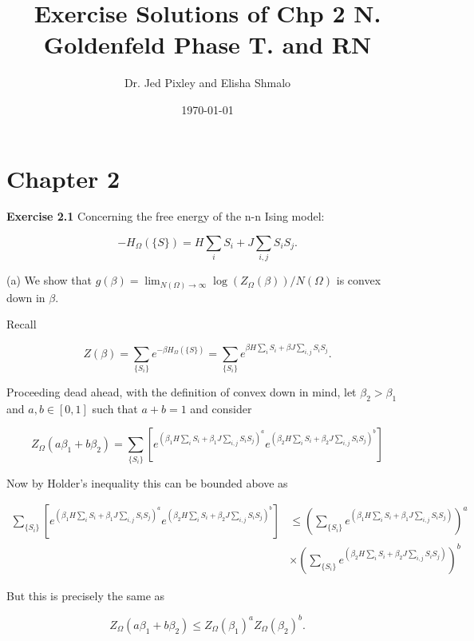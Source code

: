 \documentclass[12pt]{article}
\title{\textbf{Exercise Solutions of Chp 2 N. Goldenfeld Phase T. and RN}}
\author{Dr. Jed Pixley and Elisha Shmalo}
\date{\today}
\numberwithin{equation}{section}
\begin{document}
\maketitle

\section{Chapter 2}

\textbf{Exercise 2.1} Concerning the free energy of the n-n Ising model:

\begin{equation}
    -H_\Omega (\{S\}) = H \sum_i S_i + J\sum_{i,j}S_iS_j.
\end{equation}

(a) We show that $g(\beta) = \lim_{N(\Omega) \to \infty}\log(Z_\Omega(\beta))/N(\Omega)$ is convex down in $\beta$.

Recall 

\begin{equation}
    Z(\beta) = \sum_{\{S_i\}}e^{-\beta H_\Omega (\{S\})} = \sum_{\{S_i\}}e^{\beta H \sum_i S_i + \beta J\sum_{i,j}S_iS_j}.
\end{equation}

Proceeding dead ahead, with the definition of convex down in mind, let $\beta_2 > \beta_1$ and $a,b \in [0, 1]$ such that $a + b = 1$ and consider 

\begin{equation}
    Z_\Omega(a\beta_1 + b\beta_2) = \sum_{\{S_i\}} [e^{(\beta_1 H \sum_i S_i + \beta_1 J\sum_{i,j}S_iS_j)^a}e^{(\beta_2 H \sum_i S_i + \beta_2 J\sum_{i,j}S_iS_j)^b}]
\end{equation}

Now by Holder's inequality this can be bounded above as 

\begin{equation}
    \begin{aligned}
        \sum_{\{S_i\}} [e^{(\beta_1 H \sum_i S_i + \beta_1 J\sum_{i,j}S_iS_j)^a}e^{(\beta_2 H \sum_i S_i + \beta_2 J\sum_{i,j}S_iS_j)^b}] &\leq (\sum_{\{S_i\}} e^{(\beta_1 H \sum_i S_i + \beta_1 J\sum_{i,j}S_iS_j)})^a \\ 
        & \times (\sum_{\{S_i\}} e^{(\beta_2 H \sum_i S_i + \beta_2 J\sum_{i,j}S_iS_j)})^b
    \end{aligned}
\end{equation}

But this is precisely the same as 

\begin{equation}
    Z_\Omega(a\beta_1 + b\beta_2) \leq Z_\Omega(\beta_1)^aZ_\Omega(\beta_2)^b.
\end{equation}
\end{document}
